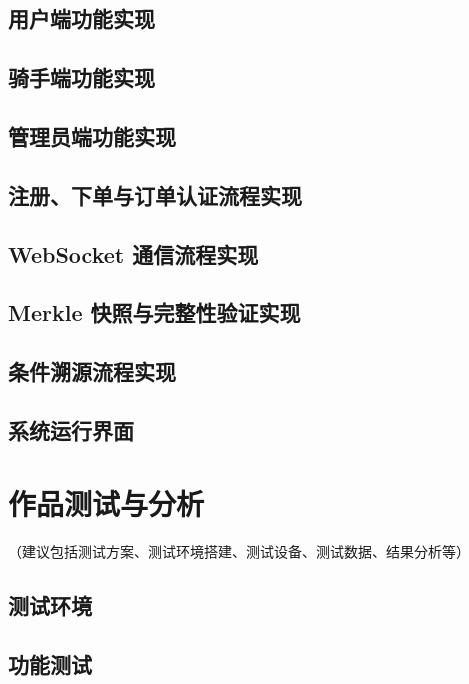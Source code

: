 \documentclass[UTF8,a4paper,zihao=-4,fontset=fandol]{ctexart}
\begin{document}
\subsection{用户端功能实现}

\subsection{骑手端功能实现}

\subsection{管理员端功能实现}

\subsection{注册、下单与订单认证流程实现}

\subsection{WebSocket 通信流程实现}

\subsection{Merkle 快照与完整性验证实现}

\subsection{条件溯源流程实现}

\subsection{系统运行界面}




\newpage
\section{作品测试与分析}
（建议包括测试方案、测试环境搭建、测试设备、测试数据、结果分析等）
\subsection{测试环境}

\subsection{功能测试}
\end{document}
